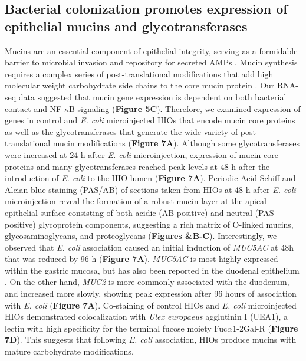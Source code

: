 \documentclass[9pt,lineo]{elife}
\begin{document}
\subsection*{{\bfseries\sffamily } Bacterial colonization promotes expression of epithelial mucins and glycotransferases}
\label{sec:orgheadline9}
Mucins are an essential component of epithelial integrity, serving as a formidable barrier to microbial invasion and repository for secreted AMPs \citep{Bergstrom:2013,Cornick:2015,Johansson:2016,Kim:2010}. Mucin synthesis requires a complex series of post-translational modifications that add high molecular weight carbohydrate side chains to the core mucin protein \citep{varki2017essentials}. Our RNA-seq data suggested that mucin gene expression is dependent on both bacterial contact and NF-\(\kappa\)B signaling (\textbf{Figure 5C}). Therefore, we examined expression of genes in control and \emph{E. coli} microinjected HIOs that encode mucin core proteins as well as the glycotransferases that generate the wide variety of post-translational mucin modifications (\textbf{Figure 7A}). Although some glycotransferases were increased at 24 h after \emph{E. coli} microinjection, expression of mucin core proteins and many glycotransferases reached peak levels at 48 h after the introduction of \emph{E. coli} to the HIO lumen (\textbf{Figure 7A}). Periodic Acid-Schiff and Alcian blue staining (PAS/AB) of sections taken from HIOs at 48 h after \emph{E. coli} microinjection reveal the formation of a robust mucin layer at the apical epithelial surface consisting of both acidic (AB-positive) and neutral (PAS-positive) glycoprotein components, suggesting a rich matrix of O-linked mucins, glycosaminoglycans, and proteoglycans (\textbf{Figures \&B-C}). Interestingly, we observed that \emph{E. coli} association caused an initial induction of \emph{MUC5AC} at 48h that was reduced by 96 h (\textbf{Figure 7A}). \emph{MUC5AC} is most highly expressed within the gastric mucosa, but has also been reported in the duodenal epithelium \citep{Buisine:1998,Buisine:2001,Rodriguez-Pineiro:2013}. On the other hand, \emph{MUC2} is more commonly associated with the duodenum, and increased more slowly, showing peak expression after 96 hours of association with \emph{E. coli} (\textbf{Figure 7A}). Co-staining of control HIOs and \emph{E. coli} microinjected HIOs demonstrated colocalization with \emph{Ulex europaeus} agglutinin I (UEA1), a lectin with high specificity for the terminal fucose moiety Fuc\(\alpha\)1-2Gal-R (\textbf{Figure 7D}). This suggests that following \emph{E. coli} association, HIOs produce mucins with mature carbohydrate modifications.
\end{document}
